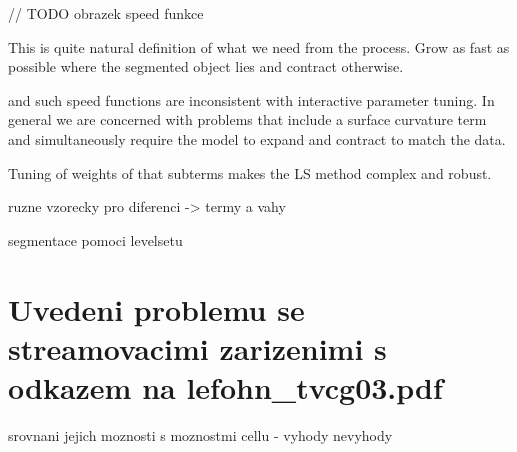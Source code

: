 // TODO obrazek speed funkce

This is quite natural definition of what we need from the process. Grow as fast as possible where the segmented object lies and contract otherwise.

and such speed functions are
inconsistent with interactive parameter tuning. In general we are concerned with problems
that include a surface curvature term and simultaneously require the model to expand and
contract to match the data.

 Tuning of weights of that subterms makes the LS method complex and robust. 


ruzne vzorecky pro diferenci -> termy a vahy

segmentace pomoci levelsetu

\section{Uvedeni problemu se streamovacimi zarizenimi s odkazem na lefohn_tvcg03.pdf}

srovnani jejich moznosti s moznostmi cellu - vyhody nevyhody